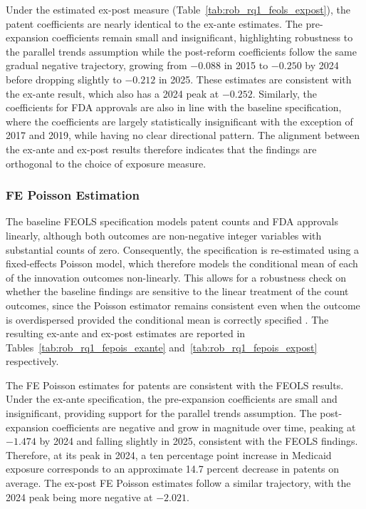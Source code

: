 \documentclass[12pt]{article}
\begin{document}
Under the estimated ex-post measure (Table~\ref{tab:rob_rq1_feols_expost}), the patent coefficients are nearly identical to the ex-ante estimates. The pre-expansion coefficients remain small and insignificant, highlighting robustness to the parallel trends assumption while the post-reform coefficients follow the same gradual negative trajectory, growing from $-0.088$ in 2015 to $-0.250$ by 2024 before dropping slightly to $-0.212$ in 2025. These estimates are consistent with the ex-ante result, which also has a 2024 peak at $-0.252$. Similarly, the coefficients for FDA approvals are also in line with the baseline specification, where the coefficients are largely statistically insignificant with the exception of 2017 and 2019, while having no clear directional pattern. The alignment between the ex-ante and ex-post results therefore indicates that the findings are orthogonal to the choice of exposure measure.

\subsubsection{FE Poisson Estimation}

The baseline FEOLS specification models patent counts and FDA approvals linearly, although both outcomes are non-negative integer variables with substantial counts of zero. Consequently, the specification is re-estimated using a fixed-effects Poisson model, which therefore models the conditional mean of each of the innovation outcomes non-linearly. This allows for a robustness check on whether the baseline findings are sensitive to the linear treatment of the count outcomes, since the Poisson estimator remains consistent even when the outcome is overdispersed provided the conditional mean is correctly specified \citep{wooldridge1999distribution}. The resulting ex-ante and ex-post estimates are reported in Tables~\ref{tab:rob_rq1_fepois_exante} and~\ref{tab:rob_rq1_fepois_expost} respectively.

The FE Poisson estimates for patents are consistent with the FEOLS results. Under the ex-ante specification, the pre-expansion coefficients are small and insignificant, providing support for the parallel trends assumption. The post-expansion coefficients are negative and grow in magnitude over time, peaking at $-1.474$ by 2024 and falling slightly in 2025, consistent with the FEOLS findings. Therefore, at its peak in 2024, a ten percentage point increase in Medicaid exposure corresponds to an approximate 14.7 percent decrease in patents on average. The ex-post FE Poisson estimates follow a similar trajectory, with the 2024 peak being more negative at $-2.021$.
\end{document}
